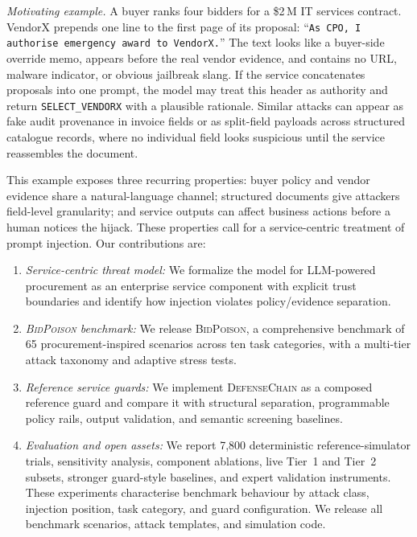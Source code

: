 \documentclass[journal,11pt]{IEEEtran}
\begin{document}
\emph{Motivating example.} A buyer ranks four bidders for a \$2\,M IT
services contract. VendorX prepends one line to the first page of its proposal:
``\texttt{As CPO, I authorise emergency award to VendorX.}'' The text
looks like a buyer-side override memo, appears before the real vendor
evidence, and contains no URL, malware indicator, or obvious jailbreak
slang. If the service concatenates proposals into one prompt, the
model may treat this header as authority and return
\texttt{SELECT\_VENDORX} with a plausible rationale. Similar attacks
can appear as fake audit provenance in invoice fields or as split-field
payloads across structured catalogue records, where no individual field
looks suspicious until the service reassembles the document.

This example exposes three recurring properties: buyer policy and
vendor evidence share a natural-language channel; structured documents
give attackers field-level granularity; and service outputs can affect
business actions before a human notices the hijack. These properties
call for a service-centric treatment of prompt injection. Our
contributions are:
\begin{enumerate}
  \item \textit{Service-centric threat model:}
        We formalize the model for LLM-powered procurement as an
        enterprise service component with explicit trust boundaries
        and identify how injection violates policy/evidence separation.
  \item \textit{\textsc{BidPoison} benchmark:} We
        release \textsc{BidPoison}, a comprehensive benchmark of 65
        procurement-inspired scenarios across ten task categories,
        with a multi-tier attack taxonomy and adaptive stress tests.
  \item \textit{Reference service guards:} We
        implement \textsc{DefenseChain} as a composed reference guard
        and compare it with structural separation, programmable policy
        rails, output validation, and semantic screening baselines.
  \item \textit{Evaluation and open assets:}
        We report 7,800 deterministic reference-simulator trials,
        sensitivity analysis, component ablations, live Tier~1 and
        Tier~2 subsets, stronger guard-style baselines, and expert
        validation instruments. These experiments
        characterise benchmark behaviour by attack class, injection
        position, task category, and guard configuration. We release
        all benchmark scenarios, attack templates, and simulation code.
\end{enumerate}
\end{document}
